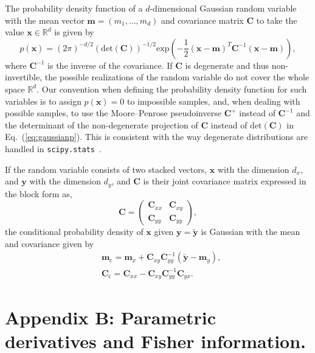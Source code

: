 \documentclass[a4paper,notitlepage]{article}
\renewcommand{\t}[1]{\mathrm{#1}}
\renewcommand{\b}[1]{\mathbf{#1}}
\renewcommand{\eqref}[1]{Eq.~(\ref{#1})}
\begin{document}
The probability density function of a $d$-dimensional Gaussian random variable with the mean vector $\b{m}=(m_1, \ldots, m_{d})$ and covariance matrix $\mathbf{C}$ to take the value $\b{x}\in\mathbb{R}^d$ is given by
\begin{equation}\label{eq:gaussianp}
p(\b{x})=(2\pi)^{-d/2}\left(\t{det}(\mathbf{C})\right)^{-1/2}\t{exp}\left(-\frac{1}{2}(\b{x}-\b{m})^T\mathbf{C}^{-1}(\b{x}-\b{m})\right),
\end{equation}
where $\mathbf{C}^{-1}$ is the inverse of the covariance. If $\b{C}$ is degenerate and thus non-invertible, the possible realizations of the random variable do not cover the whole space $\mathbb{R}^d$. Our convention when defining the probability density function for such variables is to assign $p(\b{x})=0$ to impossible samples, and, when dealing with possible samples, to use the Moore–Penrose pseudoinverse $\b{C}^+$ instead of $\b{C}^{-1}$ and the determinant of the non-degenerate projection of $\b{C}$ instead of $\t{det}(\b{C})$ in \eqref{eq:gaussianp}. This is consistent with the way degenerate distributions are handled in \texttt{scipy.stats}~\cite{scipy_mvn}.

If the random variable consists of two stacked vectors, $\b{x}$ with the dimension $d_x$, and $\b{y}$ with the dimension $d_y$, and $\b{C}$ is their joint covariance matrix expressed in the block form as,  
\begin{equation}
\b{C}=\begin{pmatrix}
\b{C}_{xx} & \b{C}_{xy}\\
\b{C}_{yy} & \b{C}_{yy}
\end{pmatrix},
\end{equation} 
the conditional probability density of $\b{x}$ given $\b{y}=\tilde{\b{y}}$ is Gaussian with the mean and covariance given by
\begin{align}
&\b{m}_\t{c}=\b{m}_x+\b{C}_{xy}\b{C}^{-1}_{yy}(\tilde{\b{y}}-\b{m}_y),\label{eq:condMean}
\\
&\b{C}_\t{c}=\b{C}_{xx}-\b{C}_{xy}\b{C}^{-1}_{yy}\b{C}_{yx}.\label{eq:condCov}
\end{align}

\setcounter{equation}{0}
\setcounter{figure}{0}
\renewcommand{\theequation}{B\arabic{equation}}
\renewcommand{\thefigure}{B\arabic{figure}}

\section*{Appendix B: Parametric derivatives and Fisher information.}
\end{document}
